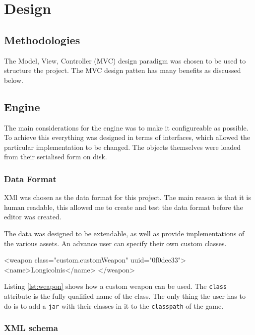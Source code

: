 \section{Design}

\subsection{Methodologies}
\label{sub:methodologies}
The Model, View, Controller (MVC) design paradigm was chosen to be used to structure the project. The MVC design patten has many benefits as discussed below.  


\subsection{Engine}
The main considerations  for the engine was to make it configureable as possible. To achieve this everything was designed in terms of interfaces, which allowed the particular implementation to be changed. The objects themselves were loaded from their serialised form on disk. 

\subsubsection{Data Format}
\label{ssub:data_format}
XMl was chosen as the data format for this project. The main reason is that it is human readable, this allowed me to create and test the data format before the editor was created.

The data was designed to be extendable, as well as provide implementations of the various assets. An advance user can specify their own custom classes.

\begin{lst:weapon}[caption=Example of Custom weapon, label=lst:weapon]
<weapon class="custom.customWeapon" uuid="0f0dee33">
	<name>Longicolnis</name>
</weapon>
\end{lst:weapon}

Listing \ref{lst:weapon} shows how a custom weapon can be used. The \texttt{class} attribute is  the fully qualified name of the class. The only thing the user has to do is to add a \texttt{jar} with their classes in it to the \texttt{classpath} of the game. 

\subsubsection{XML schema}


